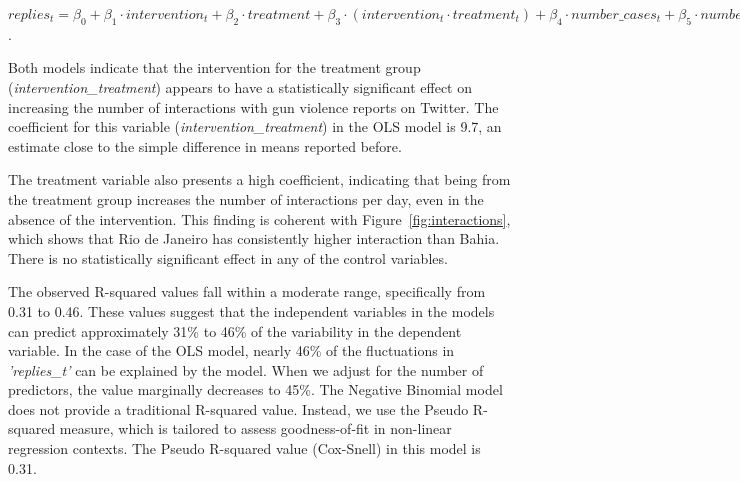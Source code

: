 \documentclass[11pt,letterpaper]{article}
\begin{document}
\vspace{10mm}
$replies_t = \beta_0 + \beta_1 \cdot intervention_t + \beta_2 \cdot treatment + \beta_3 \cdot (intervention_t \cdot treatment_t) + \beta_4 \cdot number\_cases_t + \beta_5 \cdot number\_victims_t + \beta_6 \cdot avg\_population_t + \varepsilon_t$.
\vspace{10mm}

Both models indicate that the intervention for the treatment group (\textit{intervention\_treatment}) appears to have a statistically significant effect on increasing the number of interactions with gun violence reports on Twitter. The coefficient for this variable (\textit{intervention\_treatment}) in the OLS model is 9.7, an estimate close to the simple difference in means reported before. 

The treatment variable also presents a high coefficient, indicating that being from the treatment group increases the number of interactions per day, even in the absence of the intervention. This finding is coherent with Figure~\ref{fig:interactions}, which shows that Rio de Janeiro has consistently higher interaction than Bahia. There is no statistically significant effect in any of the control variables.

The observed R-squared values fall within a moderate range, specifically from 0.31 to 0.46. These values suggest that the independent variables in the models can predict approximately 31\% to 46\% of the variability in the dependent variable. In the case of the OLS model, nearly 46\% of the fluctuations in \textit{'replies\_t'} can be explained by the model. When we adjust for the number of predictors, the value marginally decreases to 45\%. The Negative Binomial model does not provide a traditional R-squared value. Instead, we use the Pseudo R-squared measure, which is tailored to assess goodness-of-fit in non-linear regression contexts. The Pseudo R-squared value (Cox-Snell) in this model is 0.31.
\end{document}
